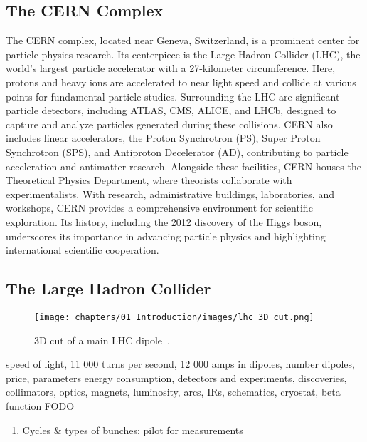 \subsection{The CERN Complex}


The CERN complex, located near Geneva, Switzerland, is a prominent center for particle physics
research. Its centerpiece is the Large Hadron Collider (LHC), the world's largest particle
accelerator with a 27-kilometer circumference. Here, protons and heavy ions are accelerated to near
light speed and collide at various points for fundamental particle studies. Surrounding the LHC are
significant particle detectors, including ATLAS, CMS, ALICE, and LHCb, designed to capture and
analyze particles generated during these collisions.  CERN also includes linear accelerators, the
Proton Synchrotron (PS), Super Proton Synchrotron (SPS), and Antiproton Decelerator (AD),
contributing to particle acceleration and antimatter research. Alongside these facilities, CERN
houses the Theoretical Physics Department, where theorists collaborate with experimentalists. With
research, administrative buildings, laboratories, and workshops, CERN provides a comprehensive
environment for scientific exploration. Its history, including the 2012 discovery of the Higgs
boson, underscores its importance in advancing particle physics and highlighting international
scientific cooperation.



\subsection{The Large Hadron Collider}

\begin{figure}[H]
    \texttt{[image: chapters/01\_Introduction/images/lhc\_3D\_cut.png]}
    \caption{3D cut of a main LHC dipole~\cite{noauthor_cern_nodate}.}
    \label{fig:3d_cut_dipole}
\end{figure}

speed of light, 11 000 turns per second, 12 000 amps in dipoles, number dipoles, price, parameters
energy consumption, detectors and experiments, discoveries, collimators, optics, magnets, luminosity, arcs, IRs, schematics, cryostat, beta function FODO

\begin{enumerate}
    \color{red}
    \item Cycles \& types of bunches: pilot for measurements
\end{enumerate}